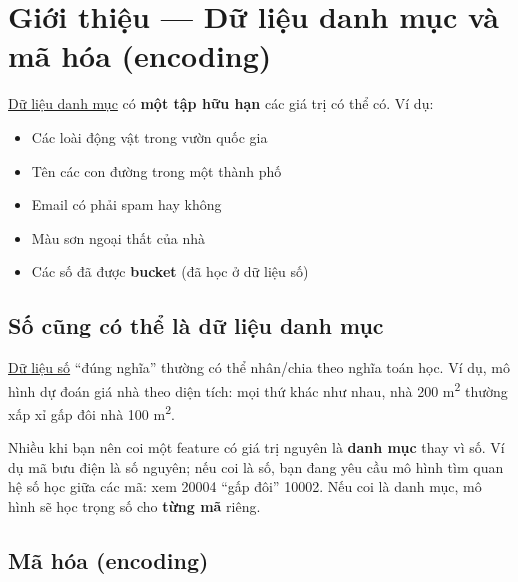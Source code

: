 \documentclass[12pt,a4paper]{article}
\begin{document}
\section{Giới thiệu --- Dữ liệu danh mục và mã hóa (encoding)}

\begin{dinhnghia}[title={Dữ liệu danh mục (categorical data)}]
\href{https://developers.google.com/machine-learning/glossary\#categorical-data}{Dữ liệu danh mục} có \textbf{một tập hữu hạn} các giá trị có thể có. Ví dụ:
\begin{itemize}
  \item Các loài động vật trong vườn quốc gia
  \item Tên các con đường trong một thành phố
  \item Email có phải spam hay không
  \item Màu sơn ngoại thất của nhà
  \item Các số đã được \textbf{bucket} (đã học ở dữ liệu số)
\end{itemize}
\end{dinhnghia}

\subsection{Số cũng có thể là dữ liệu danh mục}

\begin{ynghia}
\href{https://developers.google.com/machine-learning/glossary\#numerical-data}{Dữ liệu số} ``đúng nghĩa'' thường có thể nhân/chia theo nghĩa toán học. Ví dụ, mô hình dự đoán giá nhà theo diện tích: mọi thứ khác như nhau, nhà 200 m\textsuperscript{2} thường xấp xỉ gấp đôi nhà 100 m\textsuperscript{2}.
\end{ynghia}

\begin{luuy}
Nhiều khi bạn nên coi một feature có giá trị nguyên là \textbf{danh mục} thay vì số. Ví dụ mã bưu điện là số nguyên; nếu coi là số, bạn đang yêu cầu mô hình tìm quan hệ số học giữa các mã: xem 20004 ``gấp đôi'' 10002. Nếu coi là danh mục, mô hình sẽ học trọng số cho \textbf{từng mã} riêng.
\end{luuy}

\subsection{Mã hóa (encoding)}
\end{document}
